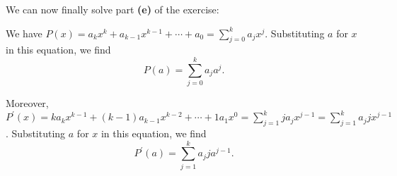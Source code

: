 \documentclass[paper=a4, fontsize=12pt]{scrartcl}%
\let\sumnonlimits\sum
\renewcommand{\sum}{\sumnonlimits\limits}
\theoremstyle{plainsl}
\theoremstyle{definition}
\theoremstyle{remark}
\begin{document}
We can now finally solve part \textbf{(e)} of the exercise:

We have $P\left(  x\right)  =a_{k}x^{k}+a_{k-1}x^{k-1}+\cdots+a_{0}=\sum
_{j=0}^{k}a_{j}x^{j}$. Substituting $a$ for $x$ in this equation, we find%
\begin{equation}
P\left(  a\right)  =\sum_{j=0}^{k}a_{j}a^{j}.
\label{sol.dualnums.basics.e.Pa=}%
\end{equation}


Moreover, $P^{\prime}\left(  x\right)  =ka_{k}x^{k-1}+\left(  k-1\right)
a_{k-1}x^{k-2}+\cdots+1a_{1}x^{0}=\sum_{j=1}^{k}ja_{j}x^{j-1}=\sum_{j=1}%
^{k}a_{j}jx^{j-1}$. Substituting $a$ for $x$ in this equation, we find%
\begin{equation}
P^{\prime}\left(  a\right)  =\sum_{j=1}^{k}a_{j}ja^{j-1}.
\label{sol.dualnums.basics.e.P'a=}%
\end{equation}
\end{document}
